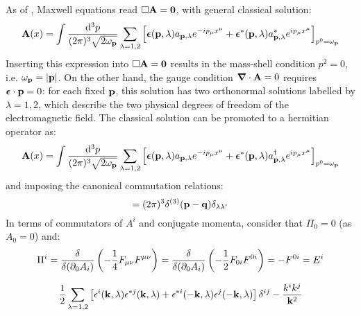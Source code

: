 As of , Maxwell equations  read $ \Box \mathbf{A} = \mathbf{0} $, with general classical solution:
\begin{equation*}
  \mathbf{A}(x) = \int \frac{\mathrm{d}^3p}{(2\pi)^3 \sqrt{2\omega_{\mathbf{p}}}} \sum_{\lambda = 1,2} \left[ \boldsymbol{\epsilon}(\mathbf{p},\lambda) a_{\mathbf{p},\lambda} e^{-i p_\mu x^\mu} + \boldsymbol{\epsilon}^*(\mathbf{p},\lambda)a^*_{\mathbf{p},\lambda} e^{i p_\mu x^\mu} \right]_{p^0 = \omega_{\mathbf{p}}}
\end{equation*}
Inserting this expression into $ \Box \mathbf{A} = \mathbf{0} $ results in the mass-shell condition $ p^2 = 0 $, i.e. $ \omega_{\mathbf{p}} = \left\lvert\mathbf{p}\right\rvert $. On the other hand, the gauge condition $ \boldsymbol{\nabla}\cdot \mathbf{A} = 0 $ requires $ \boldsymbol{\epsilon} \cdot \mathbf{p} = 0 $: for each fixed $ \mathbf{p} $, this solution has two orthonormal solutions labelled by $ \lambda = 1,2 $, which describe the two physical degrees of freedom of the electromagnetic field.
The classical solution can be promoted to a hermitian operator as:
\begin{equation}
  \mathbf{A}(x) = \int \frac{\mathrm{d}^3p}{(2\pi)^3 \sqrt{2\omega_{\mathbf{p}}}} \sum_{\lambda = 1,2} \left[ \boldsymbol{\epsilon}(\mathbf{p},\lambda) a_{\mathbf{p},\lambda} e^{-i p_\mu x^\mu} + \boldsymbol{\epsilon}^*(\mathbf{p},\lambda)a^\dagger_{\mathbf{p},\lambda} e^{i p_\mu x^\mu} \right]_{p^0 = \omega_{\mathbf{p}}}
\end{equation}
and imposing the canonical commutation relations:
\begin{equation}
  [a_{\ve{p},\lambda} , a_{\ve{q},\lambda'}\dg] = (2\pi)^3 \delta^{(3)}(\ve{p} - \ve{q}) \delta_{\lambda \lambda'}
\end{equation}
In terms of commutators of $ A^i $ and conjugate momenta, consider that $ \Pi_0 = 0 $ (as $ A_0 = 0 $) and\footnotemark:
\begin{equation*}
  \Pi^i = \frac{\delta}{\delta(\partial_0 A_i)} \left( -\frac{1}{4} F_{\mu \nu} F^{\mu \nu} \right) = \frac{\delta}{\delta(\partial_0 A_i)} \left( -\frac{1}{2} F_{0i} F^{0i} \right) = - F^{0i} = E^i
\end{equation*}
%
%
\begin{lemma}[before upper = {\tcbtitle}]{}{}
  \begin{equation}
    \frac{1}{2} \sum_{\lambda = 1,2} \left[ \epsilon^i(\mathbf{k},\lambda) \epsilon^{*j}(\mathbf{k},\lambda) + \epsilon^{*i}(-\mathbf{k},\lambda) \epsilon^j(-\mathbf{k},\lambda) \right] \delta^{ij} - \frac{k^i k^j}{\mathbf{k}^2}
  \end{equation}
\end{lemma}

